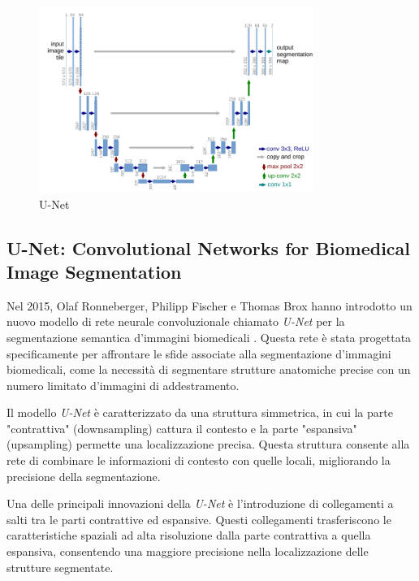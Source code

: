 \begin{figure}[H]
  \begin{center}
    \includegraphics[width=0.8\textwidth]{Immagini/unet.png}
  \end{center}
  \caption{U-Net}\label{fig:unet}
\end{figure}


\subsection{U-Net: Convolutional Networks for Biomedical Image Segmentation}

Nel 2015, Olaf Ronneberger, Philipp Fischer e Thomas Brox hanno introdotto un
nuovo modello di rete neurale convoluzionale chiamato \textit{U-Net} per la
segmentazione semantica d'immagini biomedicali \cite{ronneberger2015unet}.
Questa rete è stata progettata specificamente per affrontare le sfide associate
alla segmentazione d'immagini biomedicali, come la necessità di segmentare
strutture anatomiche precise con un numero limitato d'immagini di
addestramento.

Il modello \textit{U-Net} è caratterizzato da una struttura simmetrica, in cui
la parte "contrattiva" (downsampling) cattura il contesto e la parte "espansiva"
(upsampling) permette una localizzazione precisa. Questa struttura consente alla
rete di combinare le informazioni di contesto con quelle locali, migliorando la
precisione della segmentazione.

Una delle principali innovazioni della \textit{U-Net} è l'introduzione di
collegamenti a salti tra le parti contrattive ed espansive. Questi collegamenti
trasferiscono le caratteristiche spaziali ad alta risoluzione dalla parte
contrattiva a quella espansiva, consentendo una maggiore precisione nella
localizzazione delle strutture segmentate.

